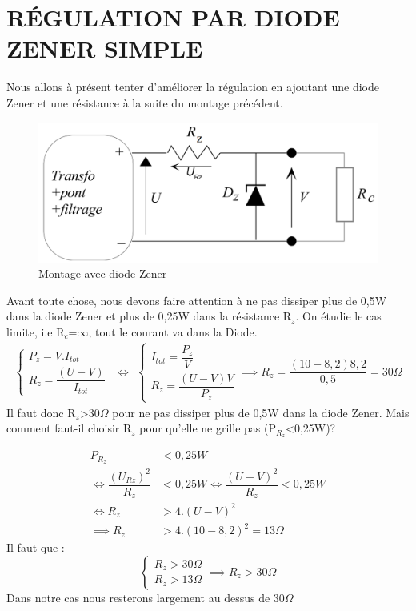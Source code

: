 \documentclass[12pt,a4paper]{article}
\begin{document}
\section{RÉGULATION PAR DIODE ZENER SIMPLE}
Nous allons à présent tenter d'améliorer la régulation en ajoutant une diode Zener et une résistance à la suite du montage précédent.
\begin{figure}[h]
\centering
\includegraphics[scale=0.2]{Zener}
\caption[Montage avec diode Zener]{Montage avec diode Zener}
\label{fig:zener}
\end{figure}
Avant toute chose, nous devons faire attention à ne pas dissiper plus de 0,5W dans la diode Zener et plus de 0,25W dans la résistance R$_{z}$. On étudie le cas limite, i.e R$_{c}$=$\infty$, tout le courant va dans la Diode.
\[
\begin{aligned}
\begin{cases}
P_{z}=V.I_{tot}\\
R_{z}=\dfrac{(U-V)}{I_{tot}}
\end{cases}
\end{aligned}
\iff
\begin{aligned}
\begin{cases}
I_{tot}=\dfrac{P_{z}}{V}\\
R_{z}=\dfrac{(U-V)V}{P_{z}}
\end{cases}
\implies R_{z}=\dfrac{(10-8,2)8,2}{0,5}=30\Omega
\end{aligned}
\]
Il faut donc R$_{z}$>30$\Omega$ pour ne pas dissiper plus de 0,5W dans la diode Zener. Mais comment faut-il choisir R$_{z}$ pour qu'elle ne grille pas (P$_{R_{z}}$<0,25W)?

\begin{align*}
P_{R_{z}}&<0,25W\\ \iff \dfrac{(U_{Rz})^{2}}{R_{z}}&<0,25W \iff \dfrac{(U-V)^{2}}{R_{z}}<0,25W\\
\iff R_{z}&>4.(U-V)^{2}\\
\implies R_{z}&>4.(10-8,2)^{2}=13\Omega
\end{align*}
Il faut que : 
\[
\begin{cases}
R_{z}>30\Omega\\
R_{z}>13\Omega
\end{cases}
\implies R_{z}>30\Omega
\]
Dans notre cas nous resterons largement au dessus de 30$\Omega$
\end{document}
